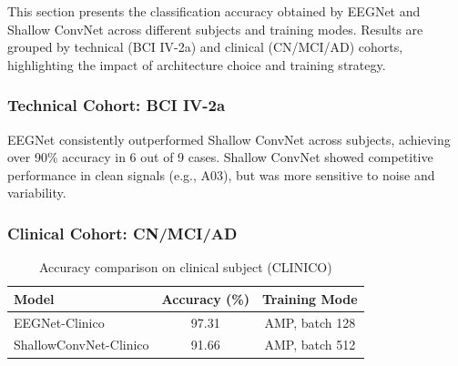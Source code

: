 \documentclass[12pt,a4paper]{article}
\begin{document}
This section presents the classification accuracy obtained by EEGNet and Shallow ConvNet across different subjects and training modes. Results are grouped by technical (BCI IV-2a) and clinical (CN/MCI/AD) cohorts, highlighting the impact of architecture choice and training strategy.

\subsubsection{Technical Cohort: BCI IV-2a}

\begin{table}[H]
\centering
\caption{Accuracy comparison by subject on BCI IV-2a dataset}
\label{tab:accuracy_bci2a}
\end{table}

EEGNet consistently outperformed Shallow ConvNet across subjects, achieving over 90\% accuracy in 6 out of 9 cases. Shallow ConvNet showed competitive performance in clean signals (e.g., A03), but was more sensitive to noise and variability.

\subsubsection{Clinical Cohort: CN/MCI/AD}

\begin{table}[H]
\centering
\caption{Accuracy comparison on clinical subject (CLINICO)}
\label{tab:accuracy_clinico}
\begin{tabular}{@{}lcc@{}}
\toprule
\textbf{Model} & \textbf{Accuracy (\%)} & \textbf{Training Mode} \\ \midrule
EEGNet-Clinico & 97.31 & AMP, batch 128 \\
ShallowConvNet-Clinico & 91.66 & AMP, batch 512 \\ \bottomrule
\end{tabular}
\end{table}
\end{document}
